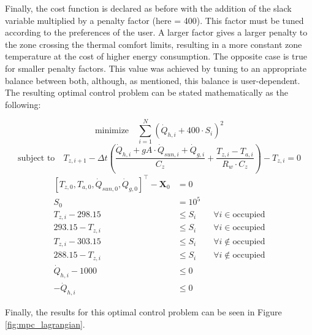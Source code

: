 Finally, the cost function is declared as before with the addition of the slack variable multiplied by a penalty factor (here = 400). This factor must be tuned according to the preferences of the user. A larger factor gives a larger penalty to the zone crossing the thermal comfort limits, resulting in a more constant zone temperature at the cost of higher energy consumption. The opposite case is true for smaller penalty factors. This value was achieved by tuning to an appropriate balance between both, although, as mentioned, this balance is user-dependent.\\

The resulting optimal control problem can be stated mathematically as the following:

\begin{equation}
{\text{minimize}} \hspace{1em} \sum_{i=1}^{N} \left(\dot{Q}_{h,i} + 400\cdot S_i\right)^2
\label{eq:mpclag1}
\end{equation}
\begin{equation}
\text{subject to}  \hspace{1em} T_{z,i+1} - \Delta t \left( \frac{\dot{Q}_{h,i} + gA \cdot \dot{Q}_{sun, i} + \dot{Q}_{g,i}}{C_z} + \frac{T_{z,i}-T_{a,i}}{R_w \cdot C_z} \right) - T_{z,i} =0
\end{equation}
\vspace{-0.5em}
\begin{align}
\left[T_{z,0}, T_{a,0}, \dot{Q}_{sun,0}, \dot{Q}_{g,0}\right]^{\top}  - \boldsymbol{X}_0 &=  0 \\[0.5em]
S_0 &= 10^5 \\[0.5em]
T_{z,i} - 298.15 &\leq S_i \hspace{2em} \forall i \in \text{occupied}\\[0.5em]
293.15 - T_{z,i} &\leq S_i \hspace{2em} \forall i \in \text{occupied}\\[0.5em]
T_{z,i} - 303.15 &\leq S_i \hspace{2em} \forall i \notin \text{occupied}\\[0.5em]
288.15 - T_{z,i} &\leq S_i \hspace{2em} \forall i \notin \text{occupied}\\[0.5em]
\dot{Q}_{h,i} - 1000 &\leq 0\\[0.5em]
-\dot{Q}_{h,i} &\leq 0
\label{eq:mpclag2}
\end{align}

Finally, the results for this optimal control problem can be seen in Figure \ref{fig:mpc_lagrangian}.

